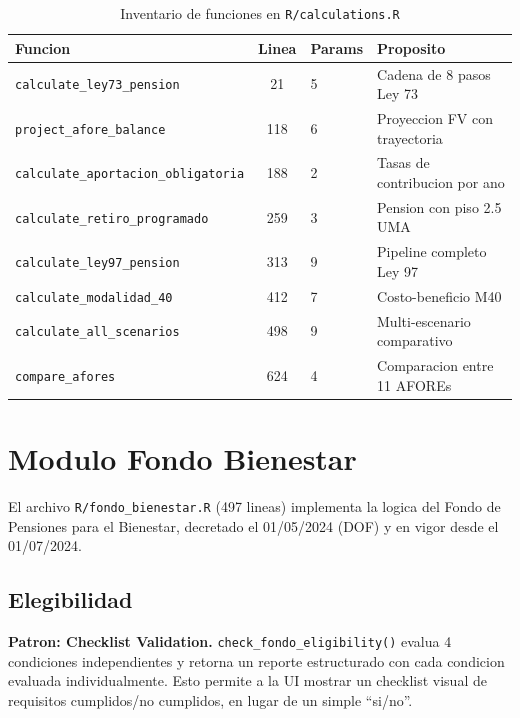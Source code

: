 \documentclass[11pt, letterpaper, twoside]{report}
\begin{document}
\begin{table}[h]
\centering
\caption{Inventario de funciones en \texttt{R/calculations.R}}
\label{tab:calc_functions}
\begin{tabularx}{\textwidth}{lclX}
\toprule
\textbf{Funcion} & \textbf{Linea} & \textbf{Params} & \textbf{Proposito} \\
\midrule
\texttt{calculate\_ley73\_pension} & 21 & 5 & Cadena de 8 pasos Ley 73 \\
\texttt{project\_afore\_balance} & 118 & 6 & Proyeccion FV con trayectoria \\
\texttt{calculate\_aportacion\_obligatoria} & 188 & 2 & Tasas de contribucion por ano \\
\texttt{calculate\_retiro\_programado} & 259 & 3 & Pension con piso 2.5 UMA \\
\texttt{calculate\_ley97\_pension} & 313 & 9 & Pipeline completo Ley 97 \\
\texttt{calculate\_modalidad\_40} & 412 & 7 & Costo-beneficio M40 \\
\texttt{calculate\_all\_scenarios} & 498 & 9 & Multi-escenario comparativo \\
\texttt{compare\_afores} & 624 & 4 & Comparacion entre 11 AFOREs \\
\bottomrule
\end{tabularx}
\end{table}


\chapter{Modulo Fondo Bienestar}
\label{ch:fondo}

El archivo \texttt{R/fondo\_bienestar.R} (497 lineas) implementa la logica del
Fondo de Pensiones para el Bienestar, decretado el 01/05/2024 (DOF) y en vigor
desde el 01/07/2024.

\section{Elegibilidad}
\label{sec:elegibilidad}

\begin{patronbox}
\textbf{Patron: Checklist Validation.} \texttt{check\_fondo\_eligibility()} evalua
4 condiciones independientes y retorna un reporte estructurado con cada condicion
evaluada individualmente. Esto permite a la UI mostrar un checklist visual de
requisitos cumplidos/no cumplidos, en lugar de un simple ``si/no''.
\end{patronbox}
\end{document}
